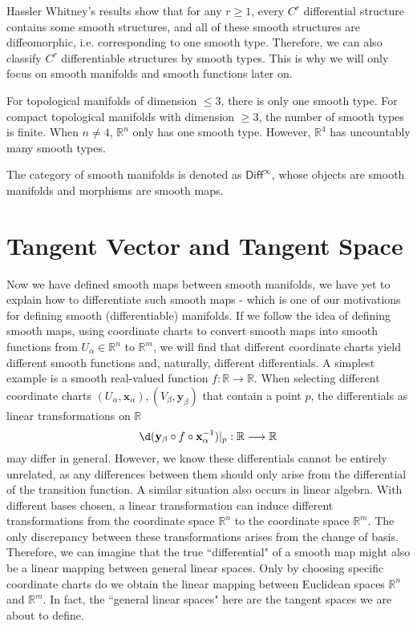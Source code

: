 \documentclass{report}
\begin{document}

Hassler Whitney's results show that for any $r\ge 1$, every $C^r$ differential structure contains some smooth structures, and all of these smooth structures are diffeomorphic, i.e. corresponding to one smooth type. Therefore, we can also classify $C^r$ differentiable structures by smooth types. This is why we will only focus on smooth manifolds and smooth functions later on. 

For topological manifolds of dimension $\le 3$, there is only one smooth type. For compact topological manifolds with dimension $\ge 3$, the number of smooth types is finite. When $n\ne 4$, $\mathbb{R}^n$ only has one smooth type. However, $\mathbb{R}^4$ has uncountably many smooth types.

The category of smooth manifolds is denoted as $\mathsf{Diff}^\infty$, whose objects are smooth manifolds and morphisms are smooth maps.

\section{Tangent Vector and Tangent Space}

Now we have defined smooth maps between smooth manifolds, we have yet to explain how to differentiate such smooth maps - which is one of our motivations for defining smooth (differentiable) manifolds. If we follow the idea of defining smooth maps, using coordinate charts to convert smooth maps into smooth functions from $U_\alpha\in\mathbb{R}^n$ to $\mathbb{R}^m$, we will find that different coordinate charts yield different smooth functions and, naturally, different differentials. A simplest example is a smooth real-valued function $f:\mathbb{R}\to\mathbb{R}$. When selecting different coordinate charts $(U_\alpha,\mathbf{x}_\alpha),(V_\beta,\mathbf{y}_\beta)$ that contain a point $p$, the differentials as linear transformations on $\mathbb{R}$
$$
\d(\mathbf{y}_\beta \circ f\circ \mathbf{x}_\alpha^{-1})|_p:\mathbb{R}\longrightarrow\mathbb{R}
$$
may differ in general. However, we know these differentials cannot be entirely unrelated, as any differences between them should only arise from the differential of the transition function. A similar situation also occurs in linear algebra. With different bases chosen, a linear transformation can induce different transformations from the coordinate space $\mathbb{R}^n$ to the coordinate space $\mathbb{R}^m$. The only discrepancy between these transformations arises from the change of basis. Therefore, we can imagine that the true ``differential" of a smooth map might also be a linear mapping between general linear spaces. Only by choosing specific coordinate charts do we obtain the linear mapping between Euclidean spaces $\mathbb{R}^n$ and $\mathbb{R}^m$. In fact, the ``general linear spaces" here are the tangent spaces we are about to define.
\end{document}
